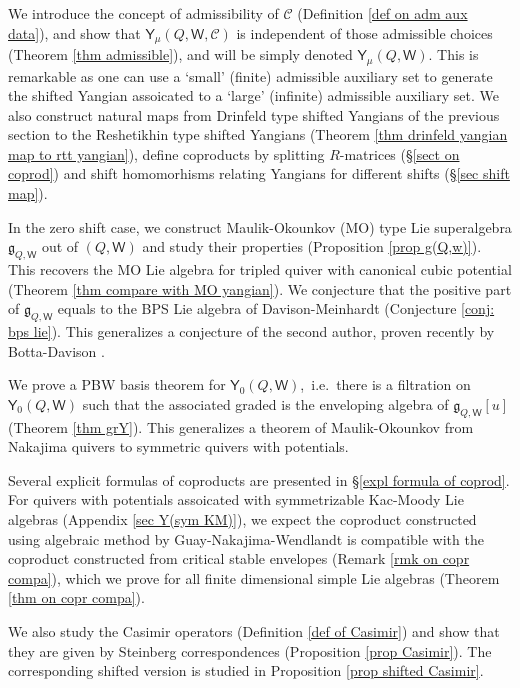 \documentclass[10pt]{amsart}
\theoremstyle{definition}
\numberwithin{equation}{section}
\newcommand{\sW}{\mathsf{W}}
\begin{document}
We introduce the concept of admissibility of $\mathcal C$ (Definition \ref{def on adm aux data}), and show that $\mathsf Y_\mu(Q,\sW,\mathcal C)$ is independent of those admissible choices (Theorem \ref{thm admissible}), and will be simply denoted $\mathsf Y_\mu(Q,\sW)$.
This is remarkable as one can use a `small' (finite) admissible auxiliary set to generate the shifted Yangian assoicated 
to a `large' (infinite) admissible auxiliary set.
We also construct natural maps
from Drinfeld type shifted Yangians of the previous section to the Reshetikhin type shifted Yangians (Theorem \ref{thm drinfeld yangian map to rtt yangian}),
define coproducts by splitting $R$-matrices (\S \ref{sect on coprod}) and shift homomorhisms relating Yangians 
for different shifts (\S \ref{sec shift map}). 

In the zero shift case, we construct Maulik-Okounkov (MO) type Lie superalgebra $\mathfrak{g}_{Q,\sW}$ out of $(Q,\sW)$ and study their properties (Proposition \ref{prop g(Q,w)}). This recovers the MO Lie algebra for tripled quiver with canonical cubic potential (Theorem \ref{thm compare with MO yangian}). We conjecture that the positive part of $\mathfrak{g}_{Q,\sW}$ equals to the BPS Lie algebra of Davison-Meinhardt \cite{DM} (Conjecture \ref{conj: bps lie}). This generalizes a conjecture of the second author, proven recently by Botta-Davison \cite{BD}.

We prove a PBW basis theorem for $\mathsf Y_0(Q,\sW)$,~i.e.~there is a filtration on $\mathsf Y_0(Q,\sW)$ such that the associated graded is the enveloping algebra of $\mathfrak{g}_{Q,\sW}[u]$ (Theorem \ref{thm grY}).
This generalizes a theorem of Maulik-Okounkov \cite[Thm.\,5.5.1]{MO} from Nakajima quivers to symmetric quivers with potentials.

Several explicit formulas of coproducts are presented in \S \ref{expl formula of coprod}. For quivers with potentials assoicated with symmetrizable Kac-Moody Lie algebras (Appendix \ref{sec Y(sym KM)}), we expect the coproduct constructed using algebraic method by Guay-Nakajima-Wendlandt \cite{GNW} is compatible with the coproduct constructed from critical stable envelopes (Remark \ref{rmk on copr compa}), which we prove for all finite dimensional simple Lie algebras (Theorem \ref{thm on copr compa}).

We also study the Casimir operators (Definition \ref{def of Casimir}) and show that they are given by 
Steinberg correspondences (Proposition \ref{prop Casimir}). The corresponding shifted version is studied in Proposition \ref{prop shifted Casimir}.
\end{document}
